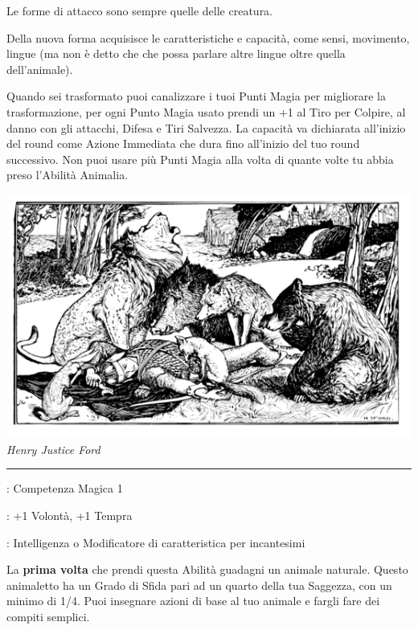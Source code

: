 \begin{multicols}{2}
Le forme di attacco sono sempre quelle delle creatura.

Della nuova forma acquisisce le caratteristiche e capacità, come sensi, movimento, lingue (ma non è detto che che possa parlare altre lingue oltre quella dell'animale).

Quando sei trasformato puoi canalizzare i tuoi Punti Magia per migliorare la trasformazione, per ogni Punto Magia usato prendi un +1 al Tiro per Colpire, al danno con gli attacchi, Difesa e Tiri Salvezza. La capacità va dichiarata all'inizio del round come Azione Immediata che dura fino all'inizio del tuo round successivo. Non puoi usare più Punti Magia alla volta di quante volte tu abbia preso l'Abilità Animalia.


\begin{center}
\includegraphics[width=0.9\linewidth]{immagini/animalia3.png}
\emph{Henry Justice Ford}
\end{center}

\smallskip\noindent\rule{\linewidth}{2pt} \hypertarget{Animaletto / Famiglio}{}\medskip{}
\noindent
\begin{description}[noitemsep, topsep=0pt, parsep=0pt, partopsep=0pt, leftmargin=0cm, labelwidth=2.5cm]
    \item[\textbf{Requisito}]: Competenza Magica 1
    \item[\textbf{Tiri Salvezza}]: +1 Volontà, +1 Tempra

    \item[\textbf{Caratteristica}]: Intelligenza o Modificatore di caratteristica per incantesimi
\end{description}

La \textbf{prima volta} che prendi questa Abilità guadagni un animale naturale. Questo animaletto ha un Grado di Sfida pari ad un quarto della tua Saggezza, con un minimo di 1/4. Puoi insegnare azioni di base al tuo animale e fargli fare dei compiti semplici.


\end{multicols}

